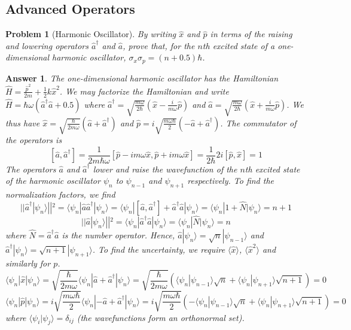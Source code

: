 \documentclass[a4paper]{article}
\newtheorem{ans}{Answer}[section]
\theoremstyle{new}
\newtheorem{qns}{Problem}[section]
\begin{document}
\subsection*{Advanced Operators}
\begin{qns}[Harmonic Oscillator]
By writing $\hat{x}$ and $\hat{p}$ in terms of the raising and lowering operators $\hat{a}^\dag$ and $\hat{a}$, prove that, for the $n$th excited state of a one-dimensional harmonic oscillator, $\sigma_x\sigma_p=(n+0.5)\hbar$.
\end{qns}
\begin{ans}
The one-dimensional harmonic oscillator has the Hamiltonian $\hat{H}=\frac{\hat{p}^2}{2m}+\frac{1}{2}k\hat{x}^2$. We may factorize the Hamiltonian and write $\hat{H}=\hbar\omega(\hat{a}^\dag\hat{a}+0.5)$ where $\hat{a}^\dag=\sqrt{\frac{m\omega}{2\hbar}}(\hat{x}-\frac{i}{m\omega}\hat{p})$ and $\hat{a}=\sqrt{\frac{m\omega}{2\hbar}}(\hat{x}+\frac{i}{m\omega}\hat{p})$. We thus have $\hat{x}=\sqrt{\frac{\hbar}{2m\omega}}(\hat{a}+\hat{a}^\dag)$ and $\hat{p}=i\sqrt{\frac{m\omega\hbar}{2}}(-\hat{a}+\hat{a}^\dag)$. The commutator of the operators is
$$[\hat{a},\hat{a}^\dag]=\frac{1}{2m\hbar\omega}[\hat{p}-im\omega\hat{x},\hat{p}+im\omega\hat{x}]=\frac{1}{2\hbar}2i[\hat{p},\hat{x}]=1$$
The operators $\hat{a}$ and $\hat{a}^\dag$ lower and raise the wavefunction of the $n$th excited state of the harmonic oscillator $\psi_n$ to $\psi_{n-1}$ and $\psi_{n+1}$ respectively. To find the normalization factors, we find
$$||\hat{a}^\dag|\psi_n\rangle||^2=\langle\psi_n|\hat{a}\hat{a}^\dag|\psi_n\rangle=\langle\psi_n|[\hat{a},\hat{a}^\dag]+\hat{a}^\dag\hat{a}|\psi_n\rangle=\langle\psi_n|1+\hat{N}|\psi_n\rangle=n+1$$
$$||\hat{a}|\psi_n\rangle||^2=\langle\psi_n|\hat{a}^\dag\hat{a}|\psi_n\rangle=\langle\psi_n|\hat{N}|\psi_n\rangle=n$$
where $\hat{N}=\hat{a}^\dag\hat{a}$ is the number operator. Hence, $\hat{a}|\psi_n\rangle=\sqrt{n}|\psi_{n-1}\rangle$ and $\hat{a}^\dag|\psi_n\rangle=\sqrt{n+1}|\psi_{n+1}\rangle$. To find the uncertainty, we require $\langle\hat{x}\rangle$, $\langle\hat{x}^2\rangle$ and similarly for $p$. 
$$\langle\psi_n|\hat{x}|\psi_n\rangle=\sqrt{\frac{\hbar}{2m\omega}}\langle\psi_n|\hat{a}+\hat{a}^\dag|\psi_n\rangle=\sqrt{\frac{\hbar}{2m\omega}}(\langle\psi_n|\psi_{n-1}\rangle\sqrt{n}+\langle\psi_n|\psi_{n+1}\rangle\sqrt{n+1})=0$$
$$\langle\psi_n|\hat{p}|\psi_n\rangle=i\sqrt{\frac{m\omega\hbar}{2}}\langle\psi_n|-\hat{a}+\hat{a}^\dag|\psi_n\rangle=i\sqrt{\frac{m\omega\hbar}{2}}(-\langle\psi_n|\psi_{n-1}\rangle\sqrt{n}+\langle\psi_n|\psi_{n+1}\rangle\sqrt{n+1})=0$$
where $\langle\psi_i|\psi_j\rangle=\delta_{ij}$ (the wavefunctions form an orthonormal set).

\end{ans}
\end{document}
